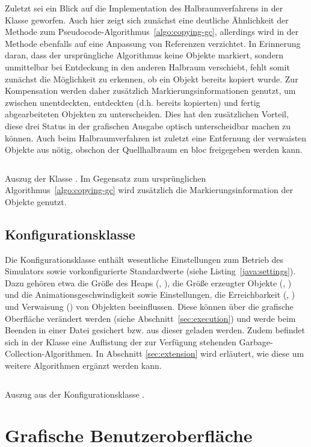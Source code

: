 Zuletzt sei ein Blick auf die Implementation des Halbraumverfahrens in der Klasse  geworfen.
Auch hier zeigt sich zunächst eine deutliche Ähnlichkeit der Methode  zum Pseudocode-Algorithmus~\ref{algo:copying-gc}, allerdings wird in der Methode  ebenfalls auf eine Anpassung von Referenzen verzichtet.
In Erinnerung daran, dass der ursprüngliche Algorithmus keine Objekte markiert, sondern unmittelbar bei Entdeckung in den anderen Halbraum verschiebt, fehlt somit zunächst die Möglichkeit zu erkennen, ob ein Objekt bereits kopiert wurde.
Zur Kompensation werden daher zusätzlich Markierungsinformationen genutzt, um zwischen unentdeckten, entdeckten (d.h. bereits kopierten) und fertig abgearbeiteten Objekten zu unterscheiden.
Dies hat den zusätzlichen Vorteil, diese drei Status in der grafischen Ausgabe optisch unterscheidbar machen zu können.
Auch beim Halbraumverfahren ist zuletzt eine Entfernung der verwaisten Objekte aus  nötig, obschon der Quellhalbraum en bloc freigegeben werden kann.

\begin{listing}[h]
	\inputminted[]{java}{code/Semispace-core.java}
	\caption[Auszug der Klasse ]{Auszug der Klasse . Im Gegensatz zum ursprünglichen Algorithmus~\ref{algo:copying-gc} wird zusätzlich die Markierungsinformation der Objekte genutzt.}
	\label{java:semispace-core}
\end{listing}

\subsection{Konfigurationsklasse}
\label{sub:settings}
Die Konfigurationsklasse  enthält wesentliche Einstellungen zum Betrieb des Simulators sowie vorkonfigurierte Standardwerte (siehe Listing~\ref{java:settings}).
Dazu gehören etwa die Größe des Heaps (, ), die Größe erzeugter Objekte (, ) und die Animationsgeschwindigkeit sowie Einstellungen, die Erreichbarkeit (, ) und Verwaisung () von Objekten beeinflussen.
Diese können über die grafische Oberfläche verändert werden (siehe Abschnitt~\ref{sec:execution}) und werde beim Beenden in einer Datei  gesichert bzw. aus dieser geladen werden.
Zudem befindet sich in der Klasse  eine Auflistung der zur Verfügung stehenden Garbage-Collection-Algorithmen.
In Abschnitt \ref{sec:extension} wird erläutert, wie diese um weitere Algorithmen ergänzt werden kann.

\begin{listing}[h]
	\inputminted[]{java}{code/Settings.java}
	\caption[Auszug aus der Konfigurationsklasse ]{Auszug aus der Konfigurationsklasse .}
	\label{java:settings}
\end{listing}

\section{Grafische Benutzeroberfläche}
\label{sec:gui}
